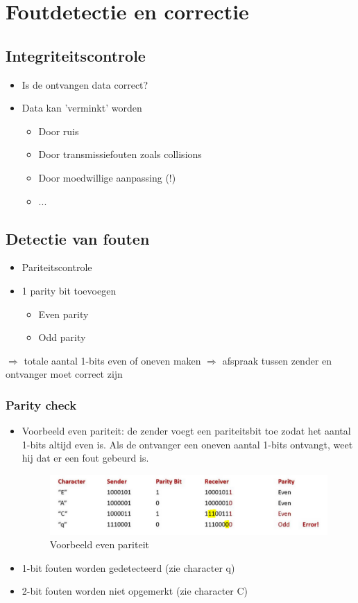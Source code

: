 \documentclass{article}
\begin{document}
\section{Foutdetectie en correctie}
\subsection{Integriteitscontrole}
\begin{itemize}
    \item Is de ontvangen data correct?
    \item Data kan 'verminkt' worden
    \begin{itemize}
        \item Door ruis
        \item Door transmissiefouten zoals collisions
        \item Door moedwillige aanpassing (!)
        \item ...
    \end{itemize}
\end{itemize}

\subsection{Detectie van fouten}
\begin{itemize}
    \item Pariteitscontrole
    \item 1 parity bit toevoegen
    \begin{itemize}
        \item Even parity
        \item Odd parity
    \end{itemize}
\end{itemize}

$\Rightarrow$ totale aantal 1-bits even of oneven maken
$\Rightarrow$ afspraak tussen zender en ontvanger moet correct zijn

\subsubsection{Parity check}
\begin{itemize}
    \item Voorbeeld even pariteit: de zender voegt een pariteitsbit toe zodat het aantal 1-bits altijd even is. 
    Als de ontvanger een oneven aantal 1-bits ontvangt, weet hij dat er een fout gebeurd is.
\begin{figure}[H]
    \centering
    \includegraphics[width=\textwidth]{Screenshot_20200420_115619.png}
    \caption{Voorbeeld even pariteit}
\end{figure}
    \item 1-bit fouten worden gedetecteerd (zie character q)
    \item 2-bit fouten worden niet opgemerkt (zie character C)
\end{itemize}
\end{document}
